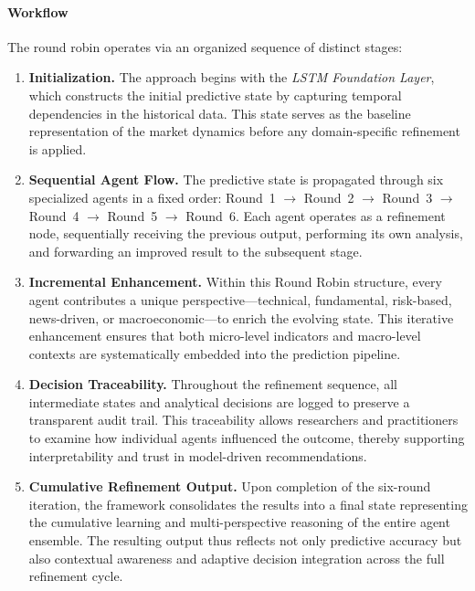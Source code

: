 \documentclass{ieeeaccess}
\begin{document}
\paragraph{Workflow} The round robin operates via an organized sequence of distinct stages:

\begin{enumerate}
    \item \textbf{Initialization.} The approach begins with the  \textit{LSTM Foundation Layer}, which constructs the initial predictive state by capturing temporal dependencies in the historical data. This state serves as the baseline representation of the market dynamics before any domain-specific refinement is applied.  

    \item \textbf{Sequential Agent Flow.} The predictive state is propagated through six specialized agents in a fixed order: Round~1 $\rightarrow$ Round~2 $\rightarrow$ Round~3 $\rightarrow$ Round~4 $\rightarrow$ Round~5 $\rightarrow$ Round~6. Each agent operates as a refinement node, sequentially receiving the previous output, performing its own analysis, and forwarding an improved result to the subsequent stage.  

    \item \textbf{Incremental Enhancement.} Within this Round Robin structure, every agent contributes a unique perspective—technical, fundamental, risk-based, news-driven, or macroeconomic—to enrich the evolving state. This iterative enhancement ensures that both micro-level indicators and macro-level contexts are systematically embedded into the prediction pipeline.  

    \item \textbf{Decision Traceability.} Throughout the refinement sequence, all intermediate states and analytical decisions are logged to preserve a transparent audit trail. This traceability allows researchers and practitioners to examine how individual agents influenced the outcome, thereby supporting interpretability and trust in model-driven recommendations.  

    \item \textbf{Cumulative Refinement Output.} Upon completion of the six-round iteration, the framework consolidates the results into a final state representing the cumulative learning and multi-perspective reasoning of the entire agent ensemble. The resulting output thus reflects not only predictive accuracy but also contextual awareness and adaptive decision integration across the full refinement cycle.  
\end{enumerate}
\end{document}
